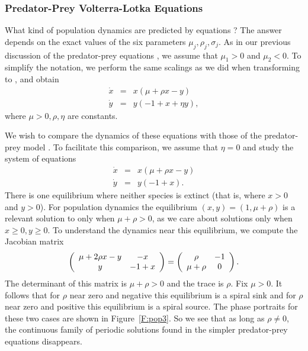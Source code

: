 \documentclass{ximera}
\begin{document}
\subsubsection*{Predator-Prey Volterra-Lotka Equations}

What kind of population dynamics are predicted by equations
?  The answer depends on the exact values of the 
six parameters $\mu_j,\rho_j,\sigma_j$.  As in our previous
discussion of the predator-prey equations , we assume
that $\mu_1>0$ and $\mu_2<0$.  To simplify the notation, we
perform the same scalings as we did when transforming  
to , and obtain
\begin{eqnarray*} 
\dot{x} & = & x(\mu + \rho x -       y) \\
\dot{y} & = & y( -1 +       x + \eta y),
\end{eqnarray*}
where $\mu>0,\rho,\eta$ are constants.  

We wish to compare the dynamics of these equations with those of 
the predator-prey model . To facilitate this 
comparison, we assume that $\eta=0$ and study the system of 
equations
\begin{equation*} \label{e:pop3}
\begin{array}{rcl}
\dot{x} & = & x(\mu + \rho x -       y) \\
\dot{y} & = & y( -1 +       x).
\end{array}
\end{equation*}
There is one equilibrium where neither species 
is extinct
(that is, where $x>0$ and $y>0$).  For population dynamics the 
equilibrium $(x,y)=(1,\mu+\rho)$ is a relevant solution to 
 only when $\mu+\rho>0$, as we care about solutions only 
when $x\geq0, y\geq 0$.  To understand the dynamics near this
equilibrium, we compute the Jacobian matrix
\[
\left(\begin{array}{cc} \mu + 2\rho x-y  & -x\\ y &-1+x\end{array}\right) = 
\left(\begin{array}{cc} \rho & -1\\ \mu+\rho &0\end{array}\right).
\]
The determinant of this matrix is $\mu+\rho>0$ and 
the trace is $\rho$.  Fix $\mu>0$.   It follows that for 
$\rho$ near zero and negative this equilibrium is a spiral 
sink and for $\rho$ near zero and positive this 
equilibrium is a spiral source.  The
phase portraits for these two cases are shown in
Figure~\ref{F:pop3}.  So we see that as long as $\rho\neq 0$,
the continuous family of periodic solutions found in the simpler
predator-prey equations  disappears.
\end{document}

